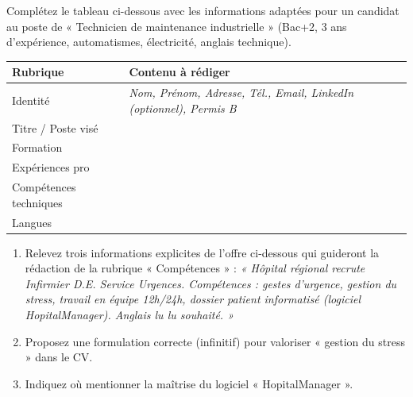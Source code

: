 \documentclass[11pt]{article}
\begin{document}
\begin{exercice}
Complétez le tableau ci-dessous avec les informations adaptées pour un candidat au poste de « Technicien de maintenance industrielle » (Bac+2, 3 ans d'expérience, automatismes, électricité, anglais technique).

\begin{tabular}{|p{3.5cm}|p{11cm}|}
\hline
\textbf{Rubrique} & \textbf{Contenu à rédiger} \\
\hline
Identité & \textit{Nom, Prénom, Adresse, Tél., Email, LinkedIn (optionnel), Permis B} \\
\hline
Titre / Poste visé & \underline{\hspace{10cm}} \\
\hline
Formation & \underline{\hspace{10cm}} \\
\hline
Expériences pro & \underline{\hspace{10cm}} \\
\hline
Compétences techniques & \underline{\hspace{10cm}} \\
\hline
Langues & \underline{\hspace{10cm}} \\
\hline
\end{tabular}
\end{exercice}

\begin{exercice}
\begin{enumerate}
    \item Relevez trois informations explicites de l'offre ci-dessous qui guideront la rédaction de la rubrique « Compétences » :
    \textit{« Hôpital régional recrute Infirmier D.E. Service Urgences. Compétences : gestes d'urgence, gestion du stress, travail en équipe 12h/24h, dossier patient informatisé (logiciel HopitalManager). Anglais lu lu souhaité. »}
    \item Proposez une formulation correcte (infinitif) pour valoriser « gestion du stress » dans le CV.
    \item Indiquez où mentionner la maîtrise du logiciel « HopitalManager ».
\end{enumerate}
\end{exercice}
\end{document}
